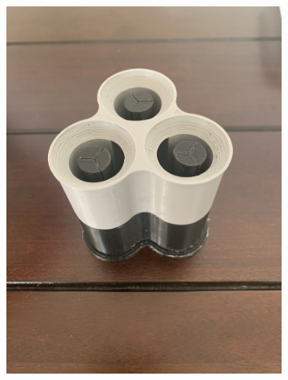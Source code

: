 \documentclass[twoside]{article}
\begin{document}
\begin{figure}[H]
	\centering
	\begin{subfigure}[b]{0.33\linewidth}
		\centering
		\includegraphics[width=\textwidth]{prep mold}
	\end{subfigure}%
	\begin{subfigure}[b]{0.33\linewidth}
		\centering		

\end{subfigure}
\end{figure}
\end{document}
